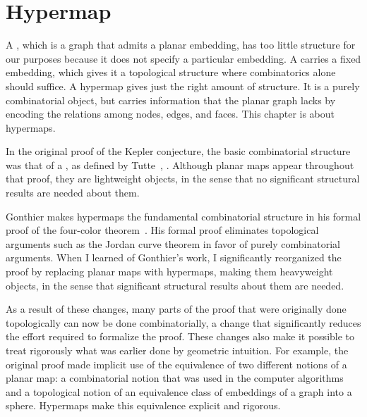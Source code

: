 \chapter{Hypermap}\label{chap:hypermap}
%

\begin{summary}
  A , which is a graph that admits a planar
  embedding, has too little structure for our purposes because it
  does not specify a particular embedding.  A 
  carries a fixed embedding, which gives it a topological structure
  where combinatorics alone should suffice.  A hypermap gives just the
  right amount of structure.  It is a purely combinatorial object, but
  carries information that the planar graph lacks by encoding the
  relations among nodes, edges, and faces.  This chapter is about
  hypermaps.

  In the original proof of the Kepler conjecture, the basic
  combinatorial structure was that of a , as
  defined by Tutte~\cite{Tutte:1973}, \cite{Tutte:1984}.  Although
  planar maps appear throughout that proof, they are lightweight
  objects, in the sense that no significant structural results are
  needed about them.

Gonthier makes hypermaps the fundamental combinatorial structure in
his formal proof of the four-color theorem~\cite{gonthier:2008:formal}.  His formal
proof eliminates topological arguments such as the Jordan curve theorem 
in favor of
purely combinatorial arguments.    When I learned of Gonthier's work,
I significantly reorganized the proof by replacing planar maps with
hypermaps, making them heavyweight objects, in the
sense that significant structural results about them are needed.

As a result of these changes, many parts of the proof that were
originally done topologically can now be done combinatorially, a change that
significantly reduces the effort required to formalize the proof.
These changes also make it possible to treat rigorously what was
earlier done by geometric intuition.  For example, the original proof
made implicit use of the equivalence of two different notions of a
planar map: a combinatorial notion that was used in the computer
algorithms and a topological notion of an equivalence class of
embeddings of a graph into a sphere.  Hypermaps make this equivalence
explicit and rigorous.


\end{summary}
